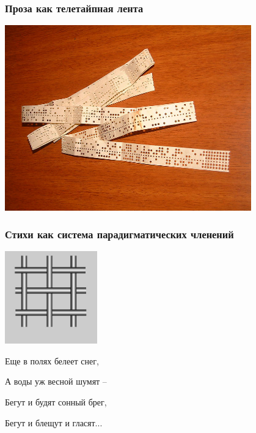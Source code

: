 \documentclass{beamer}
\begin{document}

\begin{frame}
\frametitle{Проза как телетайпная лента}

\begin{center}
\includegraphics[width=0.8\textwidth]{lenta.png}
\end{center}

\end{frame}


\begin{frame}
\frametitle{Стихи как система парадигматических членений}

\begin{center}
\includegraphics[width=0.3\textwidth]{reshetka.jpg}
\end{center}

Еще в полях белеет \color{red}снег, 

\color{black}А воды уж весной \color{green}шумят – 

\color{blue}Бегут \color{black}и будят сонный \color{red}брег, 

\color{blue}Бегут \color{black}и блещут и \color{green}гласят\color{black}...

\end{frame}
\end{document}
